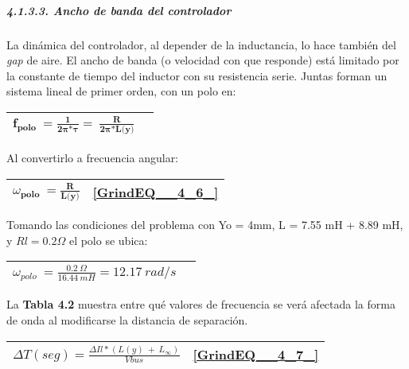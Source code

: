 \documentclass{article} %
\begin{document}
\noindent 
\subparagraph{4.1.3.3. Ancho de banda del controlador}

\noindent La din\'{a}mica del controlador, al depender de la inductancia, lo hace tambi\'{e}n del \textit{gap} de aire. El ancho de banda (o velocidad con que responde) est\'{a} limitado por la constante de tiempo del inductor con su resistencia serie. Juntas forman un sistema lineal de primer orden, con un polo en:

\noindent 

\begin{tabular}{|p{3.9in}|p{0.5in}|} \hline 
${\boldsymbol{f}}_{\boldsymbol{polo}}\boldsymbol{\ =}\frac{\boldsymbol{1}}{\boldsymbol{2}\boldsymbol{\pi }\boldsymbol{*}\boldsymbol{\tau }}\boldsymbol{=\ }\frac{\boldsymbol{R}}{\boldsymbol{2}\boldsymbol{\pi }\boldsymbol{*}\boldsymbol{L}\boldsymbol{(}\boldsymbol{y}\boldsymbol{)}}$ &  \\ \hline 
\end{tabular}



\noindent Al convertirlo a frecuencia angular:

\begin{tabular}{|p{3.9in}|p{0.4in}|} \hline 
${\omega }_{\boldsymbol{polo}}\boldsymbol{\ =}\frac{\boldsymbol{R}}{\boldsymbol{L}\boldsymbol{(}\boldsymbol{y}\boldsymbol{)}}$ & \eqref{GrindEQ__4_6_}  \\ \hline 
\end{tabular}



\noindent Tomando las condiciones del problema con Yo = 4mm, L = 7.55 mH + 8.89 mH, y $Rl=0.2\mathit{\Omega}$ el polo se ubica:

\noindent 

\begin{tabular}{|p{3.9in}|p{0.4in}|} \hline 
${\omega }_{polo}\ =\frac{0.2\ \mathit{\Omega}}{16.44\ mH}=12.17\ rad/s$ &   \\ \hline 
\end{tabular}



\noindent La \textbf{Tabla 4.2} muestra  entre qu\'{e} valores de frecuencia se ver\'{a} afectada la forma de onda al modificarse la distancia de separaci\'{o}n.

\noindent 

\begin{tabular}{|p{3.9in}|p{0.5in}|} \hline 
$\mathit{\Delta}T(seg)=\frac{\mathit{\Delta}Il*(L(y)\ +\ L_{\infty })}{Vbus}$ & \eqref{GrindEQ__4_7_}  \\ \hline 
\end{tabular}
\end{document}
